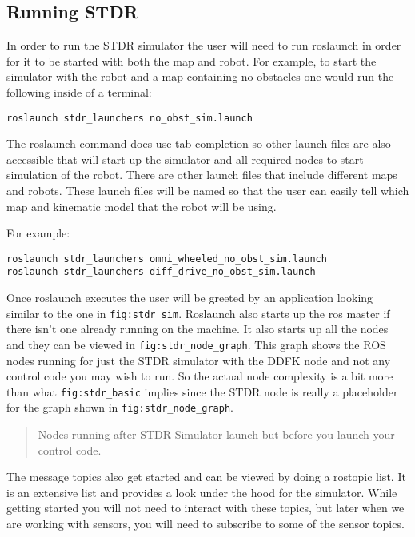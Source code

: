 \hypertarget{running-stdr}{%
\subsection{Running STDR}\label{running-stdr}}

In order to run the STDR simulator the user will need to run roslaunch
in order for it to be started with both the map and robot. For example,
to start the simulator with the robot and a map containing no obstacles
one would run the following inside of a terminal:

\begin{verbatim}
roslaunch stdr_launchers no_obst_sim.launch
\end{verbatim}

The roslaunch command does use tab completion so other launch files are
also accessible that will start up the simulator and all required nodes
to start simulation of the robot. There are other launch files that
include different maps and robots. These launch files will be named so
that the user can easily tell which map and kinematic model that the
robot will be using.

For example:

\begin{verbatim}
roslaunch stdr_launchers omni_wheeled_no_obst_sim.launch
roslaunch stdr_launchers diff_drive_no_obst_sim.launch
\end{verbatim}

Once roslaunch executes the user will be greeted by an application
looking similar to the one in \texttt{fig:stdr\_sim}. Roslaunch also
starts up the ros master if there isn't one already running on the
machine. It also starts up all the nodes and they can be viewed in
\texttt{fig:stdr\_node\_graph}. This graph shows the ROS nodes running
for just the STDR simulator with the DDFK node and not any control code
you may wish to run. So the actual node complexity is a bit more than
what \texttt{fig:stdr\_basic} implies since the STDR node is really a
placeholder for the graph shown in \texttt{fig:stdr\_node\_graph}.

\begin{quote}
Nodes running after STDR Simulator launch but before you launch your
control code.
\end{quote}

The message topics also get started and can be viewed by doing a
rostopic list. It is an extensive list and provides a look under the
hood for the simulator. While getting started you will not need to
interact with these topics, but later when we are working with sensors,
you will need to subscribe to some of the sensor topics.

